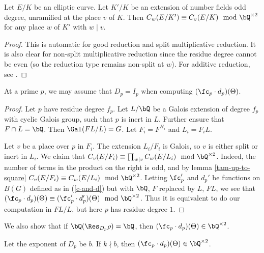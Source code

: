 \begin{lemma}\label{tam-up-to-square}
    Let $E / K$ be an elliptic curve. Let $K' / K$ be an extension of number fields odd degree, unramified at the place $v$ of $K$. Then $C_w(E / K') \equiv C_v(E / K) \mod \bQ^{\times 2}$ for any place $w$ of $K'$ with $ w \mid v$. 
\end{lemma}

\begin{proof}
This is automatic for good reduction and split multiplicative reduction. It is also clear for non-split multiplicative reduction since the residue degree cannot be even (so the reduction type remains non-split at $w$). For additive reduction, see \cite[Lemma 3.12]{reg-const}.
\end{proof}

\begin{lemma}\label{DeqI}
    At a prime $p$, we may assume that $D_p = I_p$ when computing $(\fc_p \cdot d_p)(\Theta)$. 
\end{lemma}

\begin{proof}
Let $p$ have residue degree $f_p$. Let $L / \bQ$ be a Galois extension of degree $f_p$ with cyclic Galois group, such that $p$ is inert in $L$. Further ensure that $F \cap L = \bQ$. Then $\Gal(FL / L) = G$. Let $F_i = F^{H_i}$ and $L_i = F_i L$.

Let $v$ be a place over $p$ in $F_i$. The extension $L_i / F_i$ is Galois, so $v$ is either split or inert in $L_i$.
We claim that $C_v(E / F_i) \equiv \prod_{w | v} C_w(E / L_i) \mod \bQ^{\times 2}$. Indeed, the number of terms in the product on the right is odd, and by lemma \ref{tam-up-to-square} $C_v(E / F_i) \equiv C_w(E / L_i) \mod \bQ^{\times 2}$. 
Letting $\fc_p'$ and $d_p'$ be functions on $B(G)$ defined as in (\ref{c-and-d}) but with $\bQ$, $F$ replaced by $L$, $FL$, we see that $(\fc_p \cdot d_p)(\Theta) \equiv (\fc_p' \cdot d_p')(\Theta) \mod \bQ^{\times 2}$. 
Thus it is equivalent to do our computation in $FL / L$, but here $p$ has residue degree $1$.
\end{proof}

We also show that if $\bQ(\Res_{D_p} \rho) = \bQ$, then $(\fc_p \cdot d_p)(\Theta) \in \bQ^{\times 2}$.

\begin{lemma}\label{rational-res}
    Let the exponent of $D_p$ be $b$. If $k \nmid b$, then $(\fc_p \cdot d_p)(\Theta) \in \bQ^{\times 2}$. 
\end{lemma}

